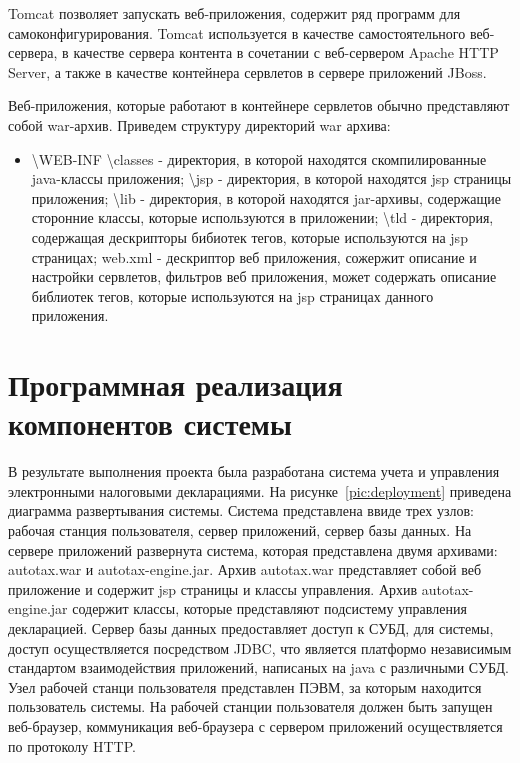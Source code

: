 \documentclass[14pt,a4paper]{reportmod}
\begin{document}
Tomcat позволяет запускать веб-приложения, содержит ряд программ для самоконфигурирования. Tomcat используется в качестве самостоятельного веб-сервера, в качестве сервера контента в сочетании с веб-сервером Apache HTTP Server, а также в качестве контейнера сервлетов в сервере приложений JBoss.

Веб-приложения, которые работают в контейнере сервлетов обычно представляют собой war-архив. Приведем структуру директорий war архива:

\begin{itemize}
  \item \textbackslash WEB-INF
    \subitem  \textbackslash classes - директория, в которой находятся скомпилированные java-классы приложения;
    \subitem  \textbackslash jsp - директория, в которой находятся jsp страницы приложения;
    \subitem  \textbackslash lib - директория, в которой находятся jar-архивы, содержащие сторонние классы, которые используются в приложении;
    \subitem  \textbackslash tld - директория, содержащая дескрипторы бибиотек тегов, которые используются на jsp страницах;
    \subitem web.xml - дескриптор веб приложения, сожержит описание и настройки сервлетов, фильтров веб приложения, может содержать описание библиотек тегов, которые используются на jsp страницах данного приложения.
\end{itemize}


\section{Программная реализация компонентов системы}

В результате выполнения проекта была разработана система учета и управления электронными налоговыми декларациями. На рисунке~\ref{pic:deployment} приведена диаграмма развертывания системы. Система представлена ввиде трех узлов: рабочая станция пользователя, сервер приложений, сервер базы данных. На сервере приложений развернута система, которая представлена двумя архивами: autotax.war и autotax-engine.jar. Архив autotax.war представляет собой веб приложение и содержит jsp страницы и классы управления. Архив autotax-engine.jar содержит классы, которые представляют подсистему управления декларацией. Сервер базы данных предоставляет доступ к СУБД, для системы, доступ осуществляется посредством JDBC, что является платформо независимым стандартом взаимодействия приложений, написаных на java с различными СУБД. Узел рабочей станци пользователя представлен ПЭВМ, за которым находится пользователь системы. На рабочей станции пользователя должен быть запущен веб-браузер, коммуникация веб-браузера с сервером приложений осуществляется по протоколу HTTP.
\end{document}
